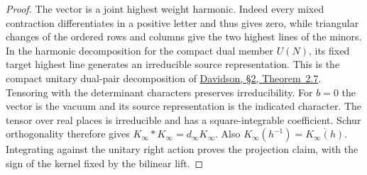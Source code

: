 \documentclass[a4paper,11pt]{article}
\theoremstyle{definition}
\theoremstyle{remark}
\numberwithin{equation}{section}
\begin{document}
\begin{proof}
The vector is a joint highest weight harmonic. Indeed every
mixed contraction differentiates in a positive letter and
thus gives zero, while triangular changes of the ordered
rows and columns give the two highest lines of the minors.
In the harmonic decomposition for the compact dual member
\(U(N)\), its fixed target highest line generates an
irreducible source representation. This is the compact
unitary dual-pair decomposition of
\href{https://msp.org/pjm/1987/129-1/pjm-v129-n1-p02-s.pdf}
{Davidson, \S2, Theorem~2.7}. Tensoring with the determinant
characters preserves irreducibility. For \(b=0\) the vector
is the vacuum and its source representation is the indicated
character. The tensor over real places is irreducible and
has a square-integrable coefficient. Schur orthogonality
therefore gives \(K_\infty*K_\infty=d_\infty K_\infty\).
Also \(K_\infty(h^{-1})=\overline{K_\infty(h)}\). Integrating
against the unitary right action proves the projection claim,
with the sign of the kernel fixed by the bilinear lift.
\end{proof}
\end{document}
